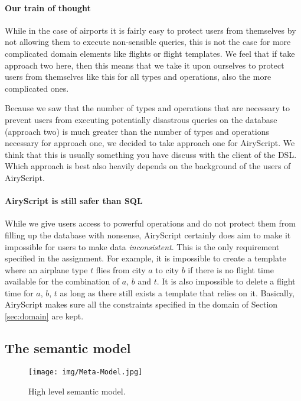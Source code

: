 \paragraph{Our train of thought}
While in the case of airports it is fairly easy to protect users from themselves
by not allowing them to execute non-sensible queries, this is not the case for
more complicated domain elements like flights or flight templates. We feel that
if take approach two here, then this means that we take it upon ourselves to
protect users from themselves like this for all types and operations, also the
more complicated ones.

Because we saw that the number of types and operations that are necessary to
prevent users from executing potentially disastrous queries on the database
(approach two) is much greater than the number of types and operations necessary
for approach one, we decided to take approach one for AiryScript. We think that
this is usually something you have discuss with the client of the DSL. Which
approach is best also heavily depends on the background of the users of
AiryScript.

\paragraph{AiryScript is still safer than SQL}
While we give users access to powerful operations and do not protect them from
filling up the database with nonsense, AiryScript certainly does aim to make it
impossible for users to make data \emph{inconsistent}. This is the only
requirement specified in the assignment. For example, it is impossible to create
a template where an airplane type $t$ flies from city $a$ to city $b$ if there
is no flight time available for the combination of $a$, $b$ and $t$. It is also
impossible to delete a flight time for $a$, $b$, $t$ as long as there still
exists a template that relies on it. Basically, AiryScript makes sure all the
constraints specified in the domain of Section \ref{sec:domain} are kept.


\subsection{The semantic model}

\begin{figure}
\texttt{[image: img/Meta-Model.jpg]}
\caption{High level semantic model.}
\label{fig:semantic-model}
\end{figure}

